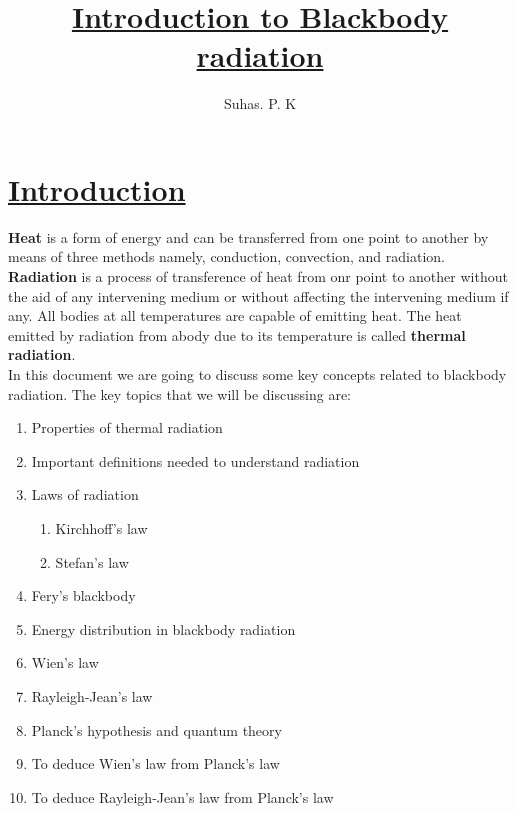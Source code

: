 \documentclass[12pt,a4paper]{article}
\title{\textbf{\underline{Introduction to Blackbody radiation}}}
\author{Suhas. P. K}
\date{}
\begin{document}
\maketitle


\section*{\underline{Introduction}}
\vspace{0.2cm}
\textbf{Heat} is a form of energy and can be transferred from one point to another by means of three methods namely, conduction, convection, and radiation.
\textbf{Radiation} is a process of transference of heat from onr point to another without the aid of any intervening medium or without affecting the intervening medium if any. All bodies at all temperatures are capable of emitting heat. The heat emitted by radiation from abody due to its temperature is called \textbf{thermal radiation}.
\\
In this document we are going to discuss some key concepts related to blackbody radiation. The key topics that we will be discussing are: 
\begin{enumerate}
	\item Properties of thermal radiation
	\item Important definitions needed to understand radiation
	\item Laws of radiation
	\begin{enumerate}
		\item Kirchhoff's law
		\item Stefan's law
	\end{enumerate}
	\item Fery's blackbody
	\item Energy distribution in blackbody radiation
	\item Wien's law
	\item Rayleigh-Jean's law
	\item Planck's hypothesis and quantum theory
	\item To deduce Wien's law from Planck's law
	\item To deduce Rayleigh-Jean's law from Planck's law
\end{enumerate}  

\newpage
\end{document}
